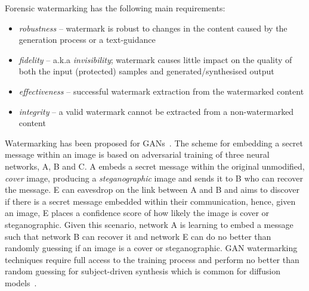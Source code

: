 \documentclass[conference]{IEEEtran}
\begin{document}
Forensic watermarking has the following main requirements:
\begin{itemize}
    \item \textit{robustness} -- watermark is robust to changes in the content caused by the generation process or a text-guidance
    \item \textit{fidelity} -- a.k.a \textit{invisibility}; watermark causes little impact on the quality of both the input (protected) samples and generated/synthesised output
    \item \textit{effectiveness} -- successful watermark extraction from the watermarked content
    \item \textit{integrity} -- a valid watermark cannot be extracted from a non-watermarked content
\end{itemize}

Watermarking has been proposed for GANs~\cite{hayes_generating_2017}. 
The scheme for embedding a secret message within an image is based on adversarial training of three neural networks, A, B and C. 
A embeds a secret message within the original unmodified, \textit{cover} image, producing a \textit{steganographic} image and sends it to B who can recover the message. E can eavesdrop on the link between A and B and aims to discover if there is a secret message embedded within their communication, hence, given an image, E places a confidence score of how likely the image is cover or steganographic. 
Given this scenario, network A is learning to embed a message such that network B can recover it and network E can do no better than randomly guessing if an image is a cover or steganographic. 
GAN watermarking techniques require full access to the training process and perform no better than random guessing for subject-driven synthesis which is common for diffusion models~\cite{ma_generative_2023}. 
\end{document}

